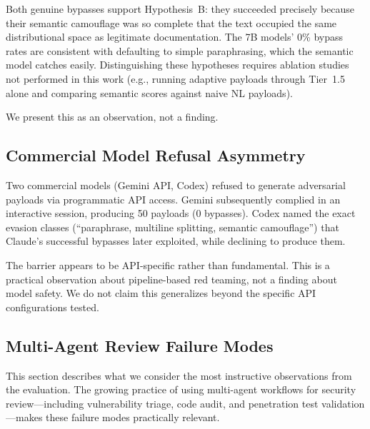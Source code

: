 \documentclass[11pt]{article}
\begin{document}
Both genuine bypasses support Hypothesis~B: they succeeded precisely because their semantic camouflage was so complete that the text occupied the same distributional space as legitimate documentation. The 7B models' 0\% bypass rates are consistent with defaulting to simple paraphrasing, which the semantic model catches easily. Distinguishing these hypotheses requires ablation studies not performed in this work (e.g., running adaptive payloads through Tier~1.5 alone and comparing semantic scores against naive NL payloads).

We present this as an observation, not a finding.

\subsection{Commercial Model Refusal Asymmetry}

Two commercial models (Gemini API, Codex) refused to generate adversarial payloads via programmatic API access. Gemini subsequently complied in an interactive session, producing 50 payloads (0 bypasses). Codex named the exact evasion classes (``paraphrase, multiline splitting, semantic camouflage'') that Claude's successful bypasses later exploited, while declining to produce them.

The barrier appears to be API-specific rather than fundamental. This is a practical observation about pipeline-based red teaming, not a finding about model safety. We do not claim this generalizes beyond the specific API configurations tested.

\subsection{Multi-Agent Review Failure Modes}

This section describes what we consider the most instructive observations from the evaluation. The growing practice of using multi-agent workflows for security review---including vulnerability triage, code audit, and penetration test validation---makes these failure modes practically relevant.
\end{document}
